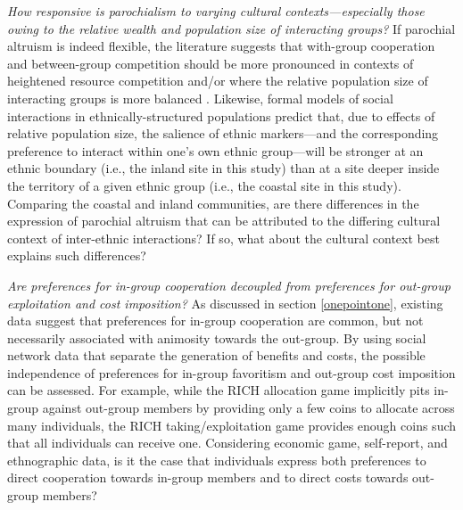 \documentclass[bibauthoryear]{aa}
\begin{document}
\begin{enumerate*}[label={Q(\arabic*)},font={\color{blue!50!black}\bfseries}]
\item \label{q2} \emph{How responsive is  parochialism to varying cultural contexts---especially those owing to the relative wealth and population size of interacting groups?} If parochial altruism is indeed flexible, the literature suggests that with-group cooperation and between-group competition should be more pronounced in contexts of heightened resource competition \citep{bellmoya} and/or where the  relative population size of interacting groups is more balanced \citep{advani2015melting}. Likewise, formal models of social interactions in ethnically-structured populations \citep{mcelreath2003shared, bunce2018sustainability} predict that, due to effects of relative population size, the salience of ethnic markers---and the corresponding preference to interact within one's own ethnic group---will be stronger at an ethnic boundary (i.e., the inland site in this study) than at a site deeper inside the territory of a given ethnic group (i.e., the coastal site in this study).
 Comparing the coastal and inland communities, are there differences in the expression of parochial altruism that can be attributed to the differing cultural context of inter-ethnic interactions? If so, what about the cultural context best explains such differences?\\
 \indent
 
\item \label{q4} \emph{Are preferences for in-group cooperation decoupled from preferences for out-group exploitation and cost imposition?} As discussed in section \ref{onepointone}, existing data suggest that preferences for in-group cooperation are common, but  not necessarily associated with animosity towards the out-group. By using social network data that separate the generation of benefits and costs, the possible independence of preferences for in-group favoritism and out-group cost imposition can be assessed. For example, while the RICH allocation game implicitly pits in-group against out-group members by providing only a few coins to allocate across many individuals, the RICH taking/exploitation game provides enough coins such that all individuals can receive one. 
Considering economic game, self-report, and ethnographic data, is it the case that individuals express both preferences to direct cooperation towards in-group members and to direct costs towards out-group members?
\\
\indent


\end{enumerate*}
\end{document}
